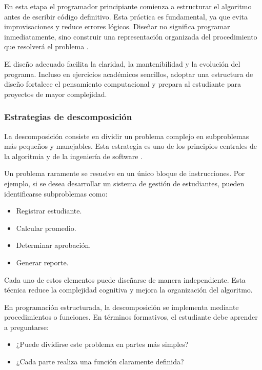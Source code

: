 \documentclass[12pt,twoside]{book}
\begin{document}
					En esta etapa el programador principiante comienza a estructurar el algoritmo antes de escribir código definitivo. Esta práctica es fundamental, ya que evita improvisaciones y reduce errores lógicos. Diseñar no significa programar inmediatamente, sino construir una representación organizada del procedimiento que resolverá el problema \cite{Hanly2015Problem}.
					
					El diseño adecuado facilita la claridad, la mantenibilidad y la evolución del programa. Incluso en ejercicios académicos sencillos, adoptar una estructura de diseño fortalece el pensamiento computacional \cite{Wing2006Computational} y prepara al estudiante para proyectos de mayor complejidad.
					
					\subsubsection{Estrategias de descomposición}
						\noindent
						La descomposición consiste en dividir un problema complejo en subproblemas más pequeños y manejables. Esta estrategia es uno de los principios centrales de la algoritmia y de la ingeniería de software \cite{Wirth1976Algorithms,Cormen2022Introduction}. 
						
						Un problema raramente se resuelve en un único bloque de instrucciones. Por ejemplo, si se desea desarrollar un sistema de gestión de estudiantes, pueden identificarse subproblemas como:
						
						\begin{itemize}
							\item Registrar estudiante.
							\item Calcular promedio.
							\item Determinar aprobación.
							\item Generar reporte.
						\end{itemize}
						
						\noindent
						Cada uno de estos elementos puede diseñarse de manera independiente. Esta técnica reduce la complejidad cognitiva y mejora la organización del algoritmo.
						
						En programación estructurada, la descomposición se implementa mediante procedimientos o funciones. En términos formativos, el estudiante debe aprender a preguntarse:
						
						\begin{itemize}
							\item ¿Puede dividirse este problema en partes más simples?
							\item ¿Cada parte realiza una función claramente definida?
						\end{itemize}
						
\end{document}
